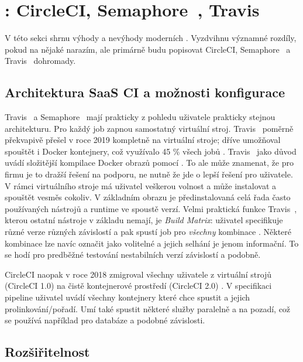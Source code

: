 \newcommand{\circleci}{\xspace{}CircleCI\xspace}
\newcommand{\travis}{\xspace{}Travis~\glstext{CI}\xspace}
\newcommand{\semaphore}{\xspace{}Semaphore~\xspace}

\section{: \circleci, \semaphore, \travis}
    V této sekci shrnu výhody a nevýhody moderních  \CI. Vyzdvihnu významné rozdíly, pokud na nějaké narazím, ale primárně budu popisovat \circleci, \semaphore a \travis dohromady.

    \subsection{Architektura SaaS CI a možnosti konfigurace}
        \travis a \semaphore mají prakticky z pohledu uživatele prakticky stejnou architekturu. Pro každý job zapnou samostatný virtuální stroj. \travis poměrně překvapivě přešel v roce 2019 kompletně na virtuální stroje; dříve umožňoval spouštět i Docker kontejnery, což využívalo 45 \% všech jobů \cite{travis-arch}. \travis jako důvod uvádí složitější kompilace Docker obrazů pomocí . To ale může znamenat, že pro firmu je to dražší řešení na podporu, ne nutně že jde o lepší řešení pro uživatele. V rámci virtuálního stroje má uživatel veškerou volnost a může instalovat a spouštět vesměs cokoliv. V základním obrazu je předinstalovaná celá řada často používaných nástrojů a runtime ve spoustě verzí. Velmi praktická funkce \travis, kterou ostatní \CI nástroje v základu nemají, je \textit{Build Matrix}: uživatel specifikuje různé verze různých závislostí a \CI pak spustí job pro \textit{všechny} kombinace \cite{travis-build-matrix}. Některé kombinace lze navíc označit jako volitelné a jejich selhání je jenom informační. To se hodí pro predběžné testování nestabilních  verzí závislostí a podobně.

        \circleci naopak v roce 2018 zmigroval všechny uživatele z virtuální strojů (\circleci 1.0) na čistě kontejnerové prostředí (\circleci 2.0) \cite{circle-migration}. V specifikaci pipeline uživatel uvádí všechny kontejnery které chce spustit a jejich prolinkování/pořadí. Umí také spustit některé služby paralelně a na pozadí, což se používá například pro databáze a podobné závislosti.

    \subsection{Rozšiřitelnost}
        \blind[2]

